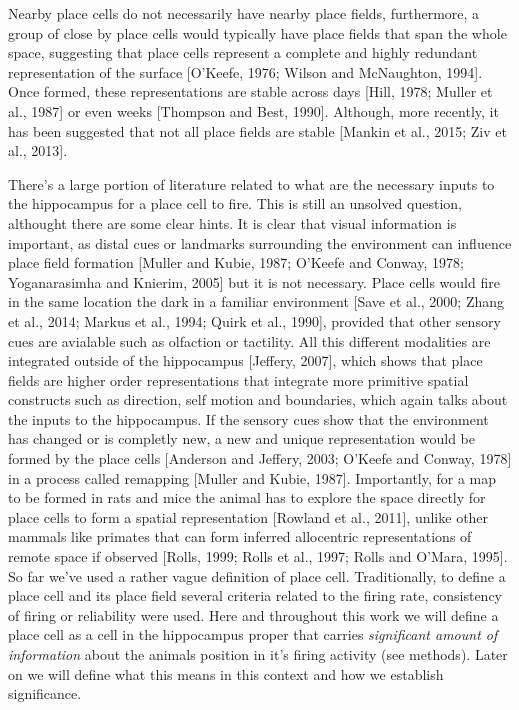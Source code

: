Nearby place cells do not necessarily have nearby place fields, furthermore, a group of close by place cells would typically have place fields that span the whole space, suggesting that place cells represent a complete and highly redundant representation of the surface [O’Keefe, 1976; Wilson and McNaughton, 1994].
Once formed, these representations are stable across days [Hill, 1978; Muller et al., 1987] or even weeks [Thompson and Best, 1990].
Although, more recently, it has been suggested that not all place fields are stable [Mankin et al., 2015; Ziv et al., 2013]. 

There's a large portion of literature related to what are the necessary inputs to the hippocampus for a place cell to fire. 
This is still an unsolved question, althought there are some clear hints. 
It is clear that visual information is important, as distal cues or landmarks surrounding the environment can influence place field formation [Muller and Kubie, 1987; O’Keefe and Conway, 1978; Yoganarasimha and Knierim, 2005] but it is not necessary. 
Place cells would fire in the same location the dark in a familiar environment [Save et al., 2000; Zhang et al., 2014; Markus et al., 1994; Quirk et al., 1990], provided that other sensory cues are avialable such as olfaction or tactility. 
All this different modalities are integrated outside of the hippocampus [Jeffery, 2007], which shows that place fields are higher order representations that integrate more primitive spatial constructs such as direction, self motion and boundaries, which again talks about the inputs to the hippocampus. 
If the sensory cues show that the environment has changed or is completly new, a new and unique representation would be formed by the place cells [Anderson and Jeffery, 2003; O’Keefe and Conway, 1978] in a process called remapping [Muller and Kubie, 1987]. 
Importantly, for a map to be formed in rats and mice the animal has to explore the space directly for place cells to form a spatial representation [Rowland et al., 2011], unlike other mammals like primates that can form inferred allocentric representations of remote space if observed [Rolls, 1999; Rolls et al., 1997; Rolls and O’Mara, 1995]. 
So far we've used a rather vague definition of place cell. 
Traditionally, to define a place cell and its place field several criteria related to the firing rate, consistency of firing or reliability were used. 
Here and throughout this work we will define a place cell as a cell in the hippocampus proper that carries \textit{significant amount of information} about the animals position in it's firing activity (see methods). Later on we will define what this means in this context and how we establish significance.  

